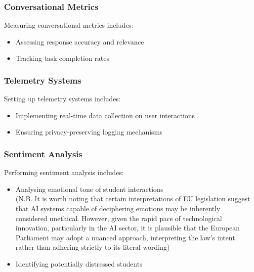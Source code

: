\documentclass[14pt,a4paper]{article}
\begin{document}
\begin{multicols}{2}

\subsubsection{Conversational Metrics}
Measuring conversational metrics \textit{\parencite[pp. 1-32]{Quarteroni2024}} includes:
\begin{itemize}
    \item Assessing response accuracy and relevance
    \item Tracking task completion rates
\end{itemize}

\subsubsection*{Telemetry Systems}
Setting up telemetry systems \textit{\parencite[pp. 30-60]{Vadapalli2023}} includes:
\begin{itemize}
    \item Implementing real-time data collection on user interactions
    \item Ensuring privacy-preserving logging mechanisms
\end{itemize}


\subsubsection*{Sentiment Analysis}
Performing sentiment analysis \textit{\parencite[pp. 50-100]{Liu2023}} includes:
\begin{itemize}
    \item Analysing emotional tone of student interactions\\ (N.B. It is worth noting that certain interpretations of EU legislation suggest that AI systems capable of deciphering emotions may be inherently considered unethical. However, given the rapid pace of technological innovation, particularly in the AI sector, it is plausible that the European Parliament may adopt a nuanced approach, interpreting the law's intent rather than adhering strictly to its literal wording) \textit{\parencite[pp. 150-175]{Dignum2023}}
    \item Identifying potentially distressed students
\end{itemize}


\end{multicols}
\end{document}
